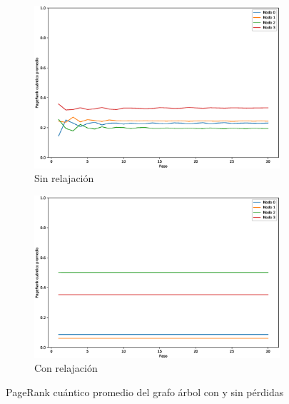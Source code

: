 \documentclass[xetex,mathserif,serif]{beamer}
\begin{document}
\begin{frame}
\begin{figure}[H]
    \centering
    \begin{subfigure}[m]{0.45\textwidth}
        \centering
        \includegraphics[width=0.9\linewidth]{img/tree-mean-lossless.eps}
        \caption{Sin relajación}
    \end{subfigure}
    \begin{subfigure}[m]{0.45\textwidth}
        \centering
        \includegraphics[width=0.9\linewidth]{img/tree-mean-lossy.eps}
        \caption{Con relajación}
    \end{subfigure}
    \caption[PageRank cuántico promedio del grafo árbol con y sin pérdidas]{PageRank cuántico promedio del grafo árbol con y sin pérdidas}
    \label{fig:meantreelossy}
\end{figure}















\end{frame}
\end{document}
